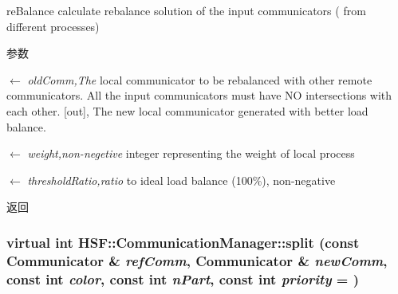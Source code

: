 reBalance calculate rebalance solution of the input communicators ( from different processes) 
\begin{DoxyParams}{参数}
\item[\mbox{$\leftarrow$} {\em oldComm,The}]local communicator to be rebalanced with other remote communicators. All the input communicators must have NO intersections with each other. \mbox{[}out\mbox{]}, The new local communicator generated with better load balance. \item[\mbox{$\leftarrow$} {\em weight,non-\/negetive}]integer representing the weight of local process \item[\mbox{$\leftarrow$} {\em thresholdRatio,ratio}]to ideal load balance (100\%), non-\/negative \end{DoxyParams}
\begin{DoxyReturn}{返回}

\end{DoxyReturn}
\hypertarget{classHSF_1_1CommunicationManager_abf8f44565535ca264f90ea7c44baf618}{
\subsubsection[{split}]{\setlength{\rightskip}{0pt plus 5cm}virtual int HSF::CommunicationManager::split (const {\bf Communicator} \& {\em refComm}, \/  {\bf Communicator} \& {\em newComm}, \/  const int {\em color}, \/  const int {\em nPart}, \/  const int {\em priority} = {})}}
\label{classHSF_1_1CommunicationManager_abf8f44565535ca264f90ea7c44baf618}


